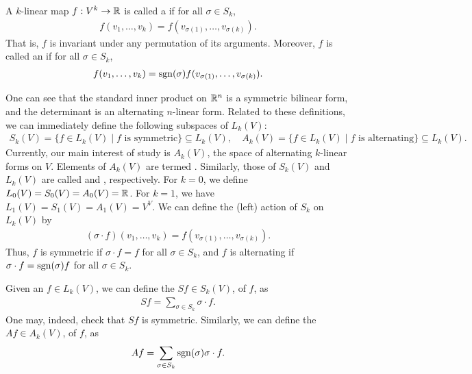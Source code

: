 \begin{definition}
    A $k$-linear map $f:V^{k} \to \mathbb{R}$ is called a  if for all $\sigma \in S_{k}$,
    \begin{align}
        f(v_{1},\ldots,v_{k}) = f(v_{\sigma(1)},\ldots,v_{\sigma(k)}).
    \end{align}
    That is, $f$ is invariant under any permutation of its arguments. Moreover, $f$ is called an  if for all $\sigma \in S_{k}$,
    \begin{align}
        f(v_{1},\ldots,v_{k}) = \operatorname{sgn}(\sigma)f(v_{\sigma(1)},\ldots,v_{\sigma(k)}).
    \end{align}
\end{definition}
One can see that the standard inner product on $\mathbb{R}^{n}$ is a symmetric bilinear form, and the determinant is an alternating $n$-linear form. Related to these definitions, we can immediately define the following subspaces of $L_{k}(V)$:
\begin{align}
    S_{k}(V) = \{f \in L_{k}(V) \mid f \text{ is symmetric}\} \subseteq L_{k}(V), \quad A_{k}(V) = \{f \in L_{k}(V) \mid f \text{ is alternating}\} \subseteq L_{k}(V).
\end{align}
Currently, our main interest of study is $A_{k}(V)$, the space of alternating $k$-linear forms on $V$. Elements of $A_{k}(V)$ are termed . Similarly, those of $S_{k}(V)$ and $L_{k}(V)$ are called  and , respectively. For $k = 0$, we define $L_{0}(V) = S_{0}(V) = A_{0}(V) = \mathbb{R}$. For $k = 1$, we have $L_{1}(V) = S_{1}(V) = A_{1}(V) = V^{V}$. We can define the (left) action of $S_{k}$ on $L_{k}(V)$ by
\begin{align}
    (\sigma \cdot f)(v_{1},\ldots,v_{k}) = f(v_{\sigma(1)},\ldots,v_{\sigma(k)}).
\end{align}
Thus, $f$ is symmetric if $\sigma \cdot f = f$ for all $\sigma \in S_{k}$, and $f$ is alternating if $\sigma \cdot f = \operatorname{sgn}(\sigma)f$ for all $\sigma \in S_{k}$.

Given an $f \in L_{k}(V)$, we can define the  $Sf \in S_{k}(V)$, of $f$, as
\begin{align}
    Sf = \sum_{\sigma \in S_{k}} \sigma \cdot f.
\end{align}
One may, indeed, check that $Sf$ is symmetric. Similarly, we can define the  $Af \in A_{k}(V)$, of $f$, as
\begin{align}
    Af = \sum_{\sigma \in S_{k}} \operatorname{sgn}(\sigma) \sigma \cdot f.
\end{align}

